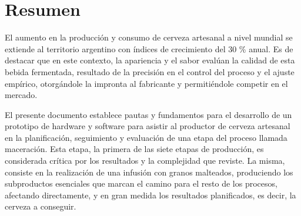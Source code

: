 \pagestyle{plain}
\afterpage{\null\newpage}\thispagestyle{plain}
\newpage
\chapter{Resumen}
\par
    El aumento en la producción y consumo de cerveza artesanal a nivel mundial se extiende al territorio argentino con índices de crecimiento del 30 \% anual. Es de destacar que en este contexto, la apariencia y el sabor evalúan la calidad de esta bebida fermentada, resultado de la precisión en el control del proceso y el ajuste empírico, otorgándole la impronta al fabricante y permitiéndole competir en el mercado.
\par
    El presente documento establece pautas y fundamentos para el desarrollo de un prototipo de hardware y software para asistir al productor de cerveza artesanal en la planificación, seguimiento y evaluación de una etapa del proceso llamada maceración. Esta etapa, la primera de las siete etapas de producción, es considerada crítica por los resultados y la complejidad que reviste. La misma, consiste en la realización de una infusión con granos malteados, produciendo los subproductos esenciales que marcan el camino para el resto de los procesos, afectando directamente, y en gran medida los resultados planificados, es decir, la cerveza a conseguir.

